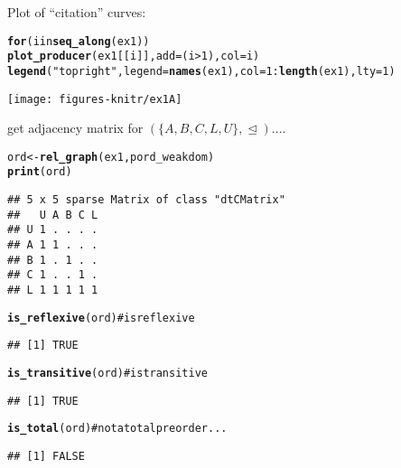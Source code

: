 \documentclass[11pt]{article}\usepackage{graphicx, color}
\makeatletter
\newcommand{\hlfunctioncall}[1]{\textcolor[rgb]{0.501960784313725,0,0.329411764705882}{\textbf{#1}}}%
\newcommand{\hlstring}[1]{\textcolor[rgb]{0.6,0.6,1}{#1}}%
\newcommand{\hlcomment}[1]{\textcolor[rgb]{0.180392156862745,0.6,0.341176470588235}{#1}}%
\newenvironment{kframe}{%
 \def\at@end@of@kframe{}%
 \ifinner\ifhmode%
  \def\at@end@of@kframe{\end{minipage}}%
  \begin{minipage}{\columnwidth}%
 \fi\fi%
 \def\FrameCommand##1{\hskip\@totalleftmargin \hskip-\fboxsep
 \colorbox{shadecolor}{##1}\hskip-\fboxsep
     \hskip-\linewidth \hskip-\@totalleftmargin \hskip\columnwidth}%
 \MakeFramed {\advance\hsize-\width
   \@totalleftmargin\z@ \linewidth\hsize
   \@setminipage}}%
 {\par\unskip\endMakeFramed%
 \at@end@of@kframe}
\newenvironment{knitrout}{}{} %
\theoremstyle{remark}
\theoremstyle{definition}
\makeatother
\begin{document}
Plot of ``citation'' curves:

\begin{knitrout}\small
{}\color{fgcolor}\begin{kframe}
\begin{alltt}
\hlfunctioncall{for} (i in \hlfunctioncall{seq_along}(ex1))
\hlfunctioncall{plot_producer}(ex1[[i]], add=(i>1), col=i)
\hlfunctioncall{legend}(\hlstring{"topright"}, legend=\hlfunctioncall{names}(ex1), col=1:\hlfunctioncall{length}(ex1), lty=1)
\end{alltt}
\end{kframe}

{\centering \texttt{[image: figures-knitr/ex1A]} 

}



\end{knitrout}


get adjacency matrix for $(\{A, B, C, L, U\}, \trianglelefteq)$....

\begin{knitrout}\small
{}\color{fgcolor}\begin{kframe}
\begin{alltt}
ord <- \hlfunctioncall{rel_graph}(ex1, pord_weakdom)
\hlfunctioncall{print}(ord)
\end{alltt}
\begin{verbatim}
## 5 x 5 sparse Matrix of class "dtCMatrix"
##   U A B C L
## U 1 . . . .
## A 1 1 . . .
## B 1 . 1 . .
## C 1 . . 1 .
## L 1 1 1 1 1
\end{verbatim}
\begin{alltt}
\hlfunctioncall{is_reflexive}(ord)  \hlcomment{# is reflexive}
\end{alltt}
\begin{verbatim}
## [1] TRUE
\end{verbatim}
\begin{alltt}
\hlfunctioncall{is_transitive}(ord) \hlcomment{# is transitive}
\end{alltt}
\begin{verbatim}
## [1] TRUE
\end{verbatim}
\begin{alltt}
\hlfunctioncall{is_total}(ord)      \hlcomment{# not a total preorder...}
\end{alltt}
\begin{verbatim}
## [1] FALSE
\end{verbatim}
\end{kframe}
\end{knitrout}
\end{document}
